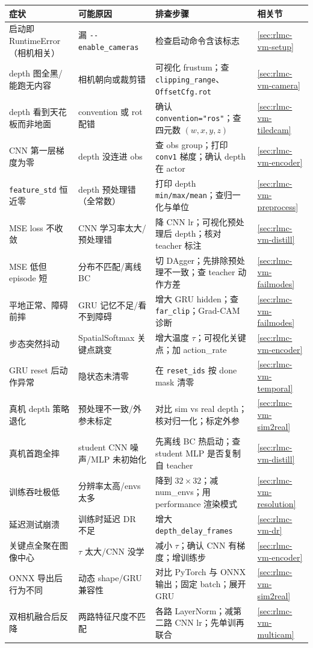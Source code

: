 \begin{center}
\small
\begin{tabular}{@{}p{3.4cm}p{3.0cm}p{3.8cm}p{1.6cm}@{}}
\toprule
症状 & 可能原因 & 排查步骤 & 相关节 \\
\midrule
启动即 RuntimeError（相机相关） & 漏 \verb|--enable_cameras| & 检查启动命令含该标志 & \cref{sec:rlmc-vm-setup} \\
depth 图全黑/能跑无内容 & 相机朝向或裁剪错 & 可视化 frustum；查 \verb|clipping_range|、\verb|OffsetCfg.rot| & \cref{sec:rlmc-vm-camera} \\
depth 看到天花板而非地面 & convention 或 rot 配错 & 确认 \verb|convention="ros"|；查四元数 $(w,x,y,z)$ & \cref{sec:rlmc-vm-tiledcam} \\
CNN 第一层梯度为零 & depth 没连进 obs & 查 obs group；打印 \verb|conv1| 梯度；确认 depth 在 actor & \cref{sec:rlmc-vm-encoder} \\
\verb|feature_std| 恒近零 & depth 预处理错（全常数） & 打印 depth \verb|min/max/mean|；查归一化与单位 & \cref{sec:rlmc-vm-preprocess} \\
MSE loss 不收敛 & CNN 学习率太大/预处理错 & 降 CNN lr；可视化预处理后 depth；核对 teacher 标注 & \cref{sec:rlmc-vm-distill} \\
MSE 低但 episode 短 & 分布不匹配/离线 BC & 切 DAgger；先排除预处理不一致；查 teacher 动作方差 & \cref{sec:rlmc-vm-failmodes} \\
平地正常、障碍前摔 & GRU 记忆不足/看不到障碍 & 增大 GRU hidden；查 \verb|far_clip|；Grad-CAM 诊断 & \cref{sec:rlmc-vm-failmodes} \\
步态突然抖动 & SpatialSoftmax 关键点跳变 & 增大温度 $\tau$；可视化关键点；加 action\_rate & \cref{sec:rlmc-vm-encoder} \\
GRU reset 后动作异常 & 隐状态未清零 & 在 \verb|reset_ids| 按 done mask 清零 & \cref{sec:rlmc-vm-temporal} \\
真机 depth 策略退化 & 预处理不一致/外参未标定 & 对比 sim vs real depth；核对归一化；标定外参 & \cref{sec:rlmc-vm-sim2real} \\
真机首跑全摔 & student CNN 噪声/MLP 未初始化 & 先离线 BC 热启动；查 student MLP 是否复制自 teacher & \cref{sec:rlmc-vm-distill} \\
训练吞吐极低 & 分辨率太高/envs 太多 & 降到 $32\times32$；减 num\_envs；用 performance 渲染模式 & \cref{sec:rlmc-vm-resolution} \\
延迟测试崩溃 & 训练时延迟 DR 不足 & 增大 \verb|depth_delay_frames| & \cref{sec:rlmc-vm-dr} \\
关键点全聚在图像中心 & $\tau$ 太大/CNN 没学 & 减小 $\tau$；确认 CNN 有梯度；增训练步 & \cref{sec:rlmc-vm-encoder} \\
ONNX 导出后行为不同 & 动态 shape/GRU 兼容性 & 对比 PyTorch 与 ONNX 输出；固定 batch；展开 GRU & \cref{sec:rlmc-vm-sim2real} \\
双相机融合后反降 & 两路特征尺度不匹配 & 各路 LayerNorm；减第二路 CNN lr；先单训再联合 & \cref{sec:rlmc-vm-multicam} \\
\bottomrule
\end{tabular}
\end{center}

